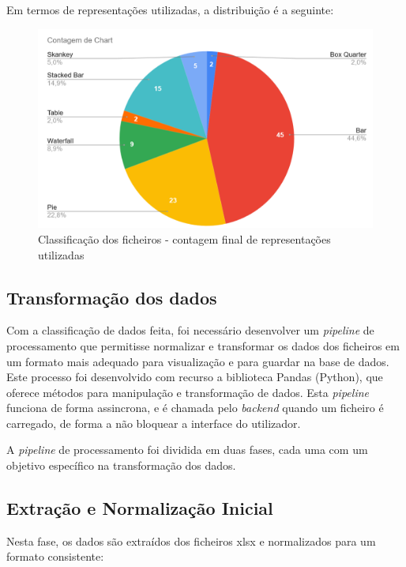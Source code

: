 Em termos de representações utilizadas, a distribuição é a seguinte:
\begin{figure}[h]
    \centering
    \includegraphics[width=\textwidth]{./img/stats2}
 \caption{Classificação dos ficheiros - contagem final de representações utilizadas}
 \end{figure}

\subsection{Transformação dos dados}

Com a classificação de dados feita, foi necessário desenvolver um \textit{pipeline} de processamento que permitisse normalizar e transformar os dados dos ficheiros em um formato mais adequado para visualização e para guardar na base de dados. Este processo foi desenvolvido com recurso a biblioteca Pandas (Python), que oferece métodos para manipulação e transformação de dados. Esta \textit{pipeline} funciona de forma assincrona, e é chamada pelo \textit{backend} quando um ficheiro é carregado, de forma a não bloquear a interface do utilizador.

A \textit{pipeline} de processamento foi dividida em duas fases, cada uma com um objetivo específico na transformação dos dados.

\subsection{Extração e Normalização Inicial}

Nesta fase, os dados são extraídos dos ficheiros \gls{xlsx} e normalizados para um formato consistente:

